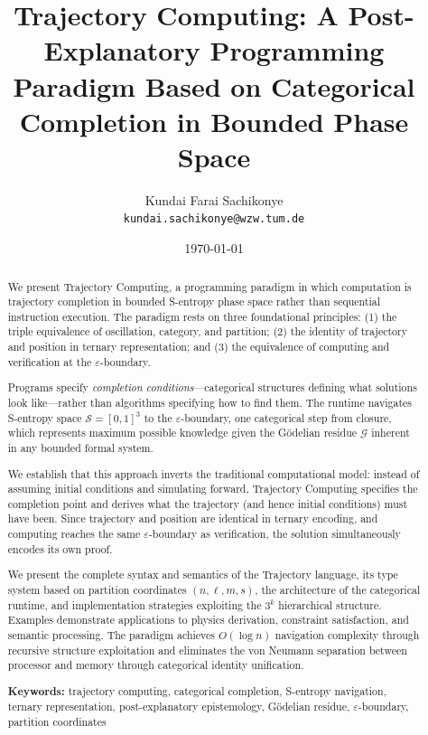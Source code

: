 \documentclass[twocolumn,10pt]{article}
\title{\textbf{Trajectory Computing: A Post-Explanatory Programming Paradigm Based on Categorical Completion in Bounded Phase Space}}
\author{
Kundai Farai Sachikonye\\
\texttt{kundai.sachikonye@wzw.tum.de}
}
\date{\today}
\theoremstyle{remark}
\newcommand{\Sspace}{\mathcal{S}}
\newcommand{\eps}{\varepsilon}
\newcommand{\Gres}{\mathcal{G}}
\begin{document}
\maketitle

\begin{abstract}
We present Trajectory Computing, a programming paradigm in which computation is trajectory completion in bounded S-entropy phase space rather than sequential instruction execution. The paradigm rests on three foundational principles: (1) the triple equivalence of oscillation, category, and partition; (2) the identity of trajectory and position in ternary representation; and (3) the equivalence of computing and verification at the $\eps$-boundary.

Programs specify \textit{completion conditions}---categorical structures defining what solutions look like---rather than algorithms specifying how to find them. The runtime navigates S-entropy space $\Sspace = [0,1]^3$ to the $\eps$-boundary, one categorical step from closure, which represents maximum possible knowledge given the Gödelian residue $\Gres$ inherent in any bounded formal system.

We establish that this approach inverts the traditional computational model: instead of assuming initial conditions and simulating forward, Trajectory Computing specifies the completion point and derives what the trajectory (and hence initial conditions) must have been. Since trajectory and position are identical in ternary encoding, and computing reaches the same $\eps$-boundary as verification, the solution simultaneously encodes its own proof.

We present the complete syntax and semantics of the Trajectory language, its type system based on partition coordinates $(n, \ell, m, s)$, the architecture of the categorical runtime, and implementation strategies exploiting the $3^k$ hierarchical structure. Examples demonstrate applications to physics derivation, constraint satisfaction, and semantic processing. The paradigm achieves $O(\log n)$ navigation complexity through recursive structure exploitation and eliminates the von Neumann separation between processor and memory through categorical identity unification.

\textbf{Keywords:} trajectory computing, categorical completion, S-entropy navigation, ternary representation, post-explanatory epistemology, Gödelian residue, $\eps$-boundary, partition coordinates
\end{abstract}
\end{document}
